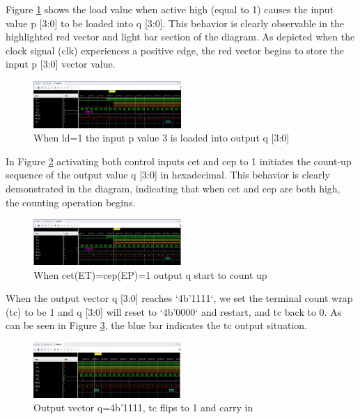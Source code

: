 \documentclass[conference]{IEEEtran}
\begin{document}
Figure \ref{fig:load_value} shows the load value when active high (equal to 1) causes the input value p [3:0] to be loaded into q [3:0]. This behavior is clearly observable in the highlighted red vector and light bar section of the diagram. As depicted when the clock signal (clk) experiences a positive edge, the red vector begins to store the input p [3:0] vector value.

\begin{figure}[h]
    \centering
    \includegraphics[width=0.5\textwidth]{verilog_simulation_2}
    \caption{When ld=1 the input p value 3 is loaded into output q [3:0]}
    \label{fig:load_value}
\end{figure}

In Figure \ref{fig:count_up} activating both control inputs cet and cep to 1 initiates the count-up sequence of the output value q [3:0] in hexadecimal. This behavior is clearly demonstrated in the diagram, indicating that when cet and cep are both high, the counting operation begins.

\begin{figure}[h]
    \centering
    \includegraphics[width=0.5\textwidth]{verilog_simulation_3}
    \caption{When cet(ET)=cep(EP)=1 output q start to count up}
    \label{fig:count_up}
\end{figure}

When the output vector q [3:0] reaches `4b’1111`, we set the terminal count wrap (tc) to be 1 and q [3:0] will reset to `4b’0000` and restart, and tc back to 0. As can be seen in Figure \ref{fig:wrap_around}, the blue bar indicates the tc output situation.

\begin{figure}[h]
    \centering
    \includegraphics[width=0.5\textwidth, height=0.1\textheight]{verilog_simulation_4}
    \caption{Output vector q=4b'1111, tc flips to 1 and carry in}
    \label{fig:wrap_around}
\end{figure}
\end{document}
